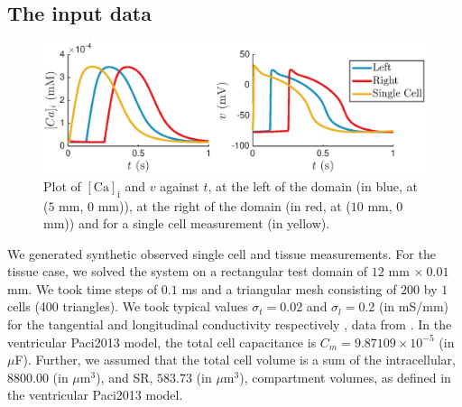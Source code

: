 \documentclass{article}
\begin{document}
\subsection{The input data} \label{The input data}
%
\begin{figure}
   \includegraphics[width=1\linewidth]{strip} 
    \caption{Plot of $[\mathrm{Ca}]_{\mathrm{i}}$ and $v$ against $t$, at the left of the domain (in blue, at ($5$ mm, $0$ mm)), at the right of the domain (in red, at ($10$ mm, $0$ mm)) and for a single cell measurement (in yellow).}
    \label{fig:3}
\end{figure}
%
We generated synthetic observed single cell and tissue measurements. For the tissue case, we solved the system on a rectangular test domain of $12$ mm $\times\: 0.01$ mm. We took time steps of $0.1$ ms and a triangular mesh consisting of $200$ by $1$ cells (400 triangles). We took typical values $\sigma_t=0.02$ and $\sigma_l=0.2$ (in mS/mm) for the tangential and longitudinal conductivity respectively \cite{Roth}, data from \cite{Plonsey1982, Plonsey1984}. In the ventricular Paci2013 model, the total cell capacitance is $C_m=9.87109\times 10^{-5}$ (in $\mu$F). Further, we assumed that the total cell volume is a sum of the intracellular, $8800.00$ (in $\mu$m$^3$), and SR, $583.73$ (in $\mu$m$^3$), compartment volumes, as defined in the ventricular Paci2013 model.
\end{document}
